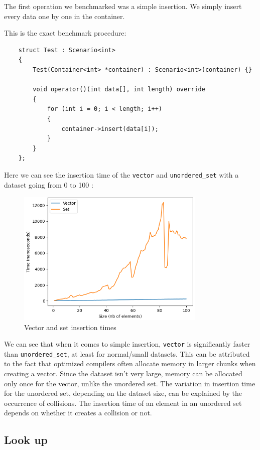 \documentclass[conference]{IEEEtran} \IEEEoverridecommandlockouts
\def\code#1{\texttt{#1}}
\begin{document}
The first operation we benchmarked was a simple insertion. We simply 
insert every data one by one in the container. 

This is the exact benchmark procedure:
\begin{lstlisting}
	struct Test : Scenario<int>
	{
		Test(Container<int> *container) : Scenario<int>(container) {}
		
		void operator()(int data[], int length) override
		{
			for (int i = 0; i < length; i++)
			{
				container->insert(data[i]);
			}
		}
	};
\end{lstlisting}

Here we can see the insertion time of the \code{vector} and 
\code{unordered\_set} with a dataset going from 0 to 100 :

\begin{figure}[!h]
	\includegraphics[width=9cm]{Diagram/insertion.png}
	\caption{Vector and set insertion times}
	\label{vector vs set insertion}
\end{figure}

We can see that when it comes to simple insertion, \code{vector} is 
significantly  faster than \code{unordered\_set}, at least for normal/small datasets. 
This can be attributed to the fact that optimized 
compilers often allocate memory in larger chunks when creating a vector. 
Since the dataset isn't very large, memory can be allocated only once 
for the vector, unlike the unordered set. The variation in insertion 
time for the unordered set, depending on the dataset size, can be 
explained by the occurrence of collisions. The insertion time of an 
element in an unordered set depends on whether it creates a collision 
or not.

\subsection{Look up}
\end{document}
